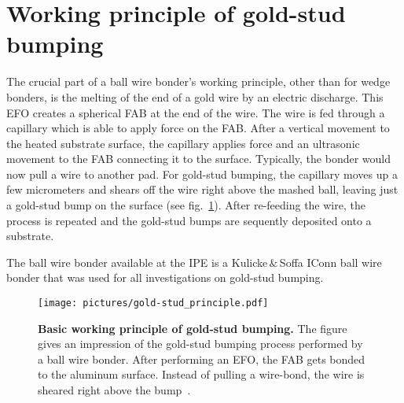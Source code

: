 %


\section{Working principle of gold-stud bumping}\label{sec:IConn_working principle}
The crucial part of a ball wire bonder's working principle, other than for wedge bonders, is the melting of the end of a gold wire by an electric discharge. This \ac{EFO} creates a spherical \ac{FAB} at the end of the wire. The wire is fed through a capillary which is able to apply force on the \ac{FAB}. After a vertical movement to the heated substrate surface, the capillary applies force and an ultrasonic movement to the \ac{FAB} connecting it to the surface. Typically, the bonder would now pull a wire to another pad. For gold-stud bumping, the capillary moves up a few micrometers and shears off the wire right above the mashed ball, leaving just a gold-stud bump on the surface (see fig.~\ref{pic:gold-stud_principle}). After re-feeding the wire, the process is repeated and the gold-stud bumps are sequently deposited onto a substrate.

The ball wire bonder available at the \ac{IPE} is a Kulicke$\,\&\,$Soffa IConn ball wire bonder that was used for all investigations on gold-stud bumping.
\begin{figure}
\begin{center}
\texttt{[image: pictures/gold-stud\_principle.pdf]}
\end{center}
\caption[Basic working principle of gold-stud bumping]{\textbf{Basic working principle of gold-stud bumping.} The figure gives an impression of the gold-stud bumping process performed by a ball wire bonder. After performing an \acl{EFO}, the \acl{FAB} gets bonded to the aluminum surface. Instead of pulling a wire-bond, the wire is sheared right above the bump~\cite{Jor03}.}\label{pic:gold-stud_principle}
\end{figure}


